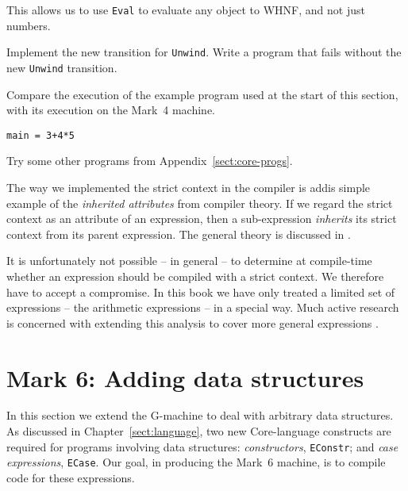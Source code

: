 This allows us to use \mbox{\tt Eval} to evaluate any object to WHNF, and not just
numbers.

\begin{exercise}\label{gm:X:unwind5}
Implement the new transition for \mbox{\tt Unwind}.
Write a program that fails without the new \mbox{\tt Unwind} transition.
\end{exercise}

\begin{exercise}\label{gm:X:compiler45}
Compare the execution of the example program used at the start of this
section, with its execution on the Mark~4 machine.
\begin{verbatim}
main = 3+4*5
\end{verbatim}
Try some other programs from Appendix~\ref{sect:core-progs}.
\end{exercise}

The way we implemented the strict context in the compiler is addis
simple example of the {\em inherited
attributes\/} from compiler theory. If we
regard the strict context as an attribute of an expression, then a
sub-expression {\em inherits\/} its strict context from its parent
expression. The general theory is discussed in \cite{Dragon}.

It is unfortunately not possible -- in general -- to determine at
compile-time whether an expression should be compiled with a strict
context. We therefore have to accept a compromise.  In this book we
have only treated a limited set of expressions -- the arithmetic
expressions -- in a special way. Much active research is concerned
with extending this analysis to cover more general expressions
\cite{BURN91:book}.


\section{Mark 6: Adding data structures}
\label{gm:ss:mark6}

In this section we extend the G-machine to deal with arbitrary data
structures. As discussed in Chapter~\ref{sect:language}, two new
Core-language constructs are required for programs involving data
structures: {\em constructors},
\mbox{\tt EConstr}; and {\em case expressions}, \mbox{\tt ECase}. Our goal, in producing the Mark~6 machine, is to
compile code for these expressions.

